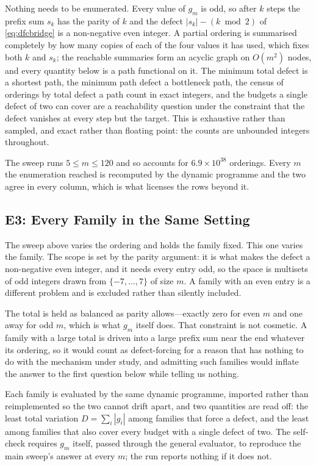 Nothing needs to be enumerated. Every value of $g_{m}$ is odd, so after $k$ steps the prefix
sum $s_{k}$ has the parity of $k$ and the defect $|s_{k}|-(k\bmod 2)$ of \eqref{eq:dfcbridge}
is a non-negative even integer. A partial ordering is summarised completely by how many
copies of each of the four values it has used, which fixes both $k$ and $s_{k}$; the reachable
summaries form an acyclic graph on $O(m^{2})$ nodes, and every quantity below is a path
functional on it. The minimum total defect is a shortest path, the minimum path defect a
bottleneck path, the census of orderings by total defect a path count in exact integers, and
the budgets a single defect of two can cover are a reachability question under the constraint
that the defect vanishes at every step but the target. This is exhaustive rather than sampled,
and exact rather than floating point: the counts are unbounded integers throughout.

The sweep runs $5\le m\le120$ and so accounts for $6.9\times10^{38}$ orderings. Every $m$ the
enumeration reached is recomputed by the dynamic programme and the two agree in every
column, which is what licenses the rows beyond it.

\subsection{E3: Every Family in the Same Setting}
\label{sec:e3}

The sweep above varies the ordering and holds the family fixed. This one varies
the family. The scope is set by the parity argument: it is what makes the defect a
non-negative even integer, and it needs every entry odd, so the space is multisets
of odd integers drawn from $\{-7,\dots,7\}$ of size $m$. A family with an even
entry is a different problem and is excluded rather than silently included.

The total is held as balanced as parity allows---exactly zero for even $m$ and one
away for odd $m$, which is what $g_{m}$ itself does. That constraint is not
cosmetic. A family with a large total is driven into a large prefix sum near the
end whatever its ordering, so it would count as defect-forcing for a reason that
has nothing to do with the mechanism under study, and admitting such families
would inflate the answer to the first question below while telling us nothing.

Each family is evaluated by the same dynamic programme, imported rather than
reimplemented so the two cannot drift apart, and two quantities are read off: the
least total variation $D=\sum_{i}|g_{i}|$ among families that force a defect, and
the least among families that also cover every budget with a single defect of two.
The self-check requires $g_{m}$ itself, passed through the general evaluator, to
reproduce the main sweep's answer at every $m$; the run reports nothing if it does
not.

